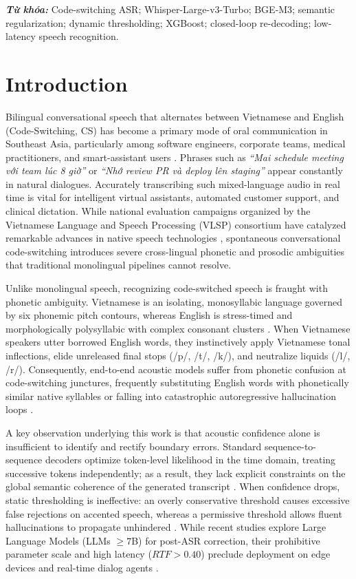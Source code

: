 \documentclass[9pt, conference, a4paper, compsocconf]{IEEEtran}
\makeatletter
\renewenvironment{IEEEkeywords}
  {\normalfont
   \@IEEEabskeysecsize
   \vspace{0.3em}       
   \setlength{\parindent}{0pt}
   \noindent
   {\bfseries\itshape \IEEEkeywordsname: }\ignorespaces}
  {\par}
\renewcommand{\IEEEkeywordsname}{Từ khóa}
\makeatother
\begin{document}
\begin{IEEEkeywords}
Code-switching ASR; Whisper-Large-v3-Turbo; BGE-M3; semantic regularization; dynamic thresholding; XGBoost; closed-loop re-decoding; low-latency speech recognition.
\end{IEEEkeywords}

\section{Introduction}
Bilingual conversational speech that alternates between Vietnamese and English (Code-Switching, CS) has become a primary mode of oral communication in Southeast Asia, particularly among software engineers, corporate teams, medical practitioners, and smart-assistant users \cite{lyu2010seame, do2023codeswitching}. Phrases such as \textit{``Mai schedule meeting với team lúc 8 giờ''} or \textit{``Nhớ review PR và deploy lên staging''} appear constantly in natural dialogues. Accurately transcribing such mixed-language audio in real time is vital for intelligent virtual assistants, automated customer support, and clinical dictation. While national evaluation campaigns organized by the Vietnamese Language and Speech Processing (VLSP) consortium \cite{vlsp2022sharedtask} have catalyzed remarkable advances in native speech technologies \cite{nguyen2024phowhisper, luong2016vivos}, spontaneous conversational code-switching introduces severe cross-lingual phonetic and prosodic ambiguities that traditional monolingual pipelines cannot resolve.

Unlike monolingual speech, recognizing code-switched speech is fraught with phonetic ambiguity. Vietnamese is an isolating, monosyllabic language governed by six phonemic pitch contours, whereas English is stress-timed and morphologically polysyllabic with complex consonant clusters \cite{le2022phonetic}. When Vietnamese speakers utter borrowed English words, they instinctively apply Vietnamese tonal inflections, elide unreleased final stops (/p/, /t/, /k/), and neutralize liquids (/l/, /r/). Consequently, end-to-end acoustic models suffer from phonetic confusion at code-switching junctures, frequently substituting English words with phonetically similar native syllables or falling into catastrophic autoregressive hallucination loops \cite{radford2023whisper, shan2019investigating}.

A key observation underlying this work is that acoustic confidence alone is insufficient to identify and rectify boundary errors. Standard sequence-to-sequence decoders optimize token-level likelihood in the time domain, treating successive tokens independently; as a result, they lack explicit constraints on the global semantic coherence of the generated transcript \cite{huang2023dynamic}. When confidence drops, static thresholding is ineffective: an overly conservative threshold causes excessive false rejections on accented speech, whereas a permissive threshold allows fluent hallucinations to propagate unhindered \cite{huang2023dynamic}. While recent studies explore Large Language Models (LLMs $\ge 7$B) for post-ASR correction, their prohibitive parameter scale and high latency ($RTF > 0.40$) preclude deployment on edge devices and real-time dialog agents \cite{park2024generative}.
\end{document}
